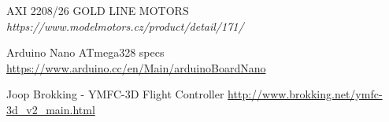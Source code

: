 \begin{thebibliography}{9}
             AXI 2208/26 GOLD LINE MOTORS \\ 
\textit{https://www.modelmotors.cz/product/detail/171/}

             Arduino Nano ATmega328 specs \\ 
\url{https://www.arduino.cc/en/Main/arduinoBoardNano}





Joop Brokking - YMFC-3D Flight Controller
\url{http://www.brokking.net/ymfc-3d_v2_main.html}








\end{thebibliography}




